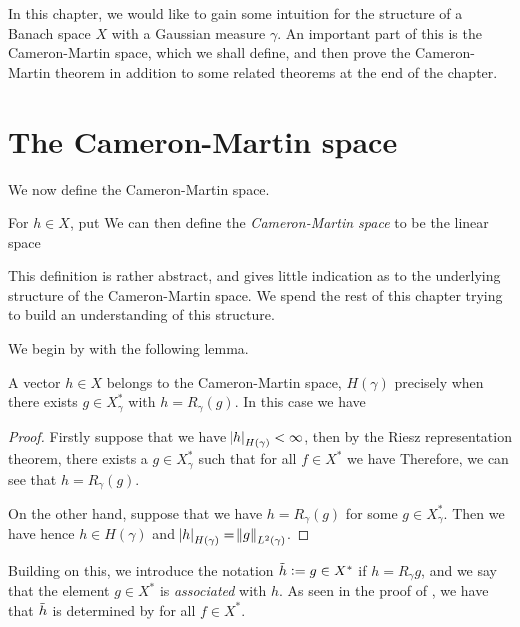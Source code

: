 \documentclass[../main.tex]{subfiles}
\begin{document}
In this chapter, we would like to gain some intuition for the structure of a Banach space $X$ with a Gaussian measure $\gamma$. An important part of this is the Cameron-Martin space, which we shall define, and then prove the Cameron-Martin theorem in addition to some related theorems at the end of the chapter.

\section{The Cameron-Martin space}

We now define the Cameron-Martin space.
\begin{definition}
For $h\in X$, put  We can then define the \emph{Cameron-Martin space} to be the linear space 
\end{definition}
This definition is rather abstract, and gives little indication as to the underlying structure of the Cameron-Martin space. We spend the rest of this chapter trying to build an understanding of this structure.

We begin by with the following lemma.
\begin{lemma}
\label{lem:CM1}
A vector $h\in X$ belongs to the Cameron-Martin space, $H(\gamma)$ precisely when there exists $g\in X_\gamma^*$ with $h = R_\gamma(g)$. In this case we have 
\end{lemma}
\begin{proof}
Firstly suppose that we have $\abs{h}_{H(\gamma)}<\infty$, then by the Riesz representation theorem, there exists a $g\in X_\gamma^*$ such that for all $f\in X^*$ we have  Therefore, we can see that $h = R_\gamma(g)$.

On the other hand, suppose that we have $h = R_\gamma(g)$ for some $g\in X_\gamma^*$. Then we have  hence $h\in H(\gamma)$ and $\abs{h}_{H(\gamma)} = \norm{g}_{L^2(\gamma)}$.
\end{proof}

Building on this, we introduce the notation $\Tilde{h} := g\in X^*$ if $h = R_\gamma g$, and we say that the element $g\in X^*$ is \emph{associated} with $h$. As seen in the proof of , we have that $\Tilde{h}$ is determined by  for all $f\in X^*$.
\end{document}
